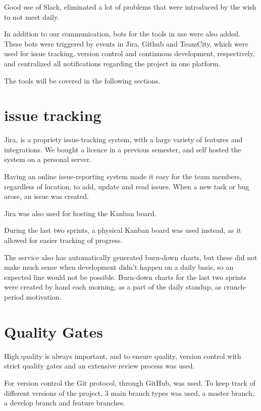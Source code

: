 Good use of Slack, eliminated a lot of problems that were introduced by the wish to not meet daily.

 
In addition to our communication, bots for the tools in use were also added.
These bots were triggered by events in Jira, Github and TeamCity, which were used for issue tracking, version control and continuous development, respectively, and centralized all notifications regarding the project in one platform.

The tools will be covered in the following sections.

\section{issue tracking}
Jira, is a propriety issue-tracking system, with a large variety of features and integrations.
We bought a licence in a previous semester, and self hosted the system on a personal server.


Having an online issue-reporting system made it easy for the team members, regardless of location, to add, update and read issues. 
When a new task or bug arose, an issue was created.

Jira was also used for hosting the Kanban board.

During the last two sprints, a physical Kanban board was used instead, as it allowed for easier tracking of progress.

The service also has automatically generated burn-down charts, but these did not make much sense when development didn't happen on a daily basis, so an expected line would not be possible.
Burn-down charts for the last two sprints were created by hand each morning, as a part of the daily standup, as crunch-period motivation.


\section{Quality Gates}
High quality is always important, and to ensure quality, version control with strict quality gates and an extensive review process was used.

For version control the Git protocol, through GitHub, was used.
To keep track of different versions of the project, 3 main branch types was used, a master branch, a develop branch and feature branches.

